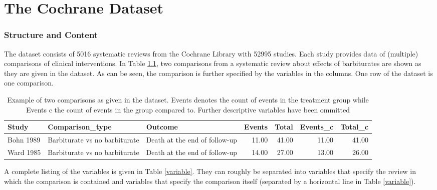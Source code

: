\documentclass[11pt,a4paper,twoside]{book}\usepackage[]{graphicx}\usepackage[]{color}
\begin{document}














\chapter{The Cochrane Dataset} 

\subsection{Structure and Content}
The dataset consists of 5016 systematic reviews from the Cochrane Library with 52995 studies.
Each study provides data of (multiple) comparisons of clinical interventions. 
In Table \ref{barbiturate.row}, two comparisons from a systematic review about effects of barbiturates are shown as they are given in the dataset. As can be seen, the comparison is further specified by the variables in the columns. One row of the dataset is one comparison.

\begin{table}[ht]
\centering
\begingroup\scriptsize
\begin{tabular}{lllrrrr}
  \hline
Study & Comparison\_type & Outcome & Events & Total & Events\_c & Total\_c \\ 
  \hline
Bohn 1989 & Barbiturate vs no barbiturate & Death at the end of follow-up & 11.00 & 41.00 & 11.00 & 41.00 \\ 
  Ward 1985 & Barbiturate vs no barbiturate & Death at the end of follow-up & 14.00 & 27.00 & 13.00 & 26.00 \\ 
   \hline
\end{tabular}
\endgroup
\caption{Example of two comparisons as given in the dataset. Events denotes the count of events in the treatment group while Events c the count of events in the group compared to. Further descriptive variables have been ommitted} 
\label{barbiturate.row}
\end{table}


A complete listing of the variables is given in Table \ref{variable}. They can roughly be separated into variables that specify the review in which the comparison is contained and variables that specify the comparison itself (separated by a horizontal line in Table \ref{variable}).
\end{document}
